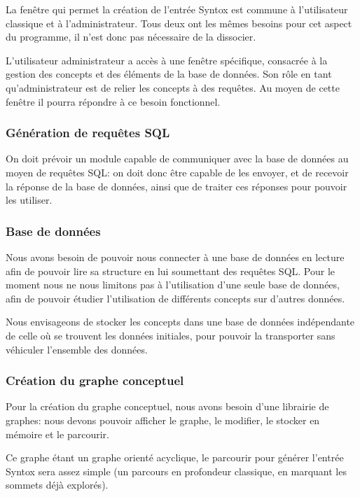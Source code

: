 \documentclass[12pt]{report}
\begin{document}
La fenêtre qui permet la création de l'entrée Syntox est commune à l'utilisateur classique et à l'administrateur. Tous deux ont les mêmes besoins pour cet aspect du programme, il n'est donc pas nécessaire de la dissocier.

\bigskip

L'utilisateur administrateur a accès à une fenêtre spécifique, consacrée à la gestion des concepts et des éléments de la base de données. Son rôle en tant qu'administrateur est de relier les concepts à des requêtes. Au moyen de cette fenêtre il pourra répondre à ce besoin fonctionnel.


\subsubsection{Génération de requêtes SQL}

On doit prévoir un module capable de communiquer avec la base de données au moyen de requêtes SQL: on doit donc être capable de les envoyer, et de recevoir la réponse de la base de données, ainsi que de traiter ces réponses pour pouvoir les utiliser.

\subsubsection{Base de données}

Nous avons besoin de pouvoir nous connecter à une base de données en lecture afin de pouvoir lire sa structure en lui soumettant des requêtes SQL. Pour le moment nous ne nous limitons pas à l'utilisation d'une seule base de données, afin de pouvoir étudier l'utilisation de différents concepts sur d'autres données.

Nous envisageons de stocker les concepts dans une base de données indépendante de celle où se trouvent les données initiales, pour pouvoir la transporter sans véhiculer l'ensemble des données.

\subsubsection{Création du graphe conceptuel}

Pour la création du graphe conceptuel, nous avons besoin d'une librairie de graphes:
nous devons pouvoir afficher le graphe, le modifier, le stocker en mémoire et le parcourir.

Ce graphe étant un graphe orienté acyclique, le parcourir pour générer l'entrée Syntox sera assez simple (un parcours en profondeur classique, en marquant les sommets déjà explorés).
  
\end{document}
